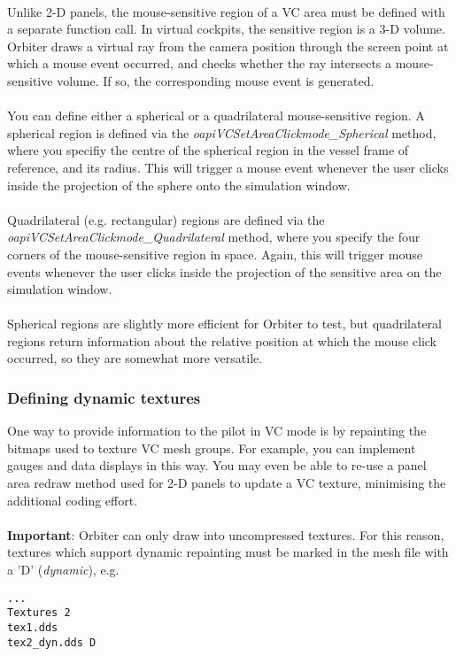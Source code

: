 \documentclass[Orbiter Developer Manual.tex]{subfiles}
\begin{document}
\\
Unlike 2-D panels, the mouse-sensitive region of a VC area must be defined with a separate function call. In virtual cockpits, the sensitive region is a 3-D volume. Orbiter draws a virtual ray from the camera position through the screen point at which a mouse event occurred, and checks whether the ray intersects a mouse-sensitive volume. If so, the corresponding mouse event is generated.\\
\\
You can define either a spherical or a quadrilateral mouse-sensitive region. A spherical region is defined via the \textit{oapiVCSetAreaClickmode\_Spherical} method, where you specifiy the centre of the spherical region in the vessel frame of reference, and its radius. This will trigger a mouse event whenever the user clicks inside the projection of the sphere onto the simulation window.\\
\\
Quadrilateral (e.g. rectangular) regions are defined via the \textit{oapiVCSetAreaClickmode\_Quadrilateral} method, where you specify the four corners of the mouse-sensitive region in space. Again, this will trigger mouse events whenever the user clicks inside the projection of the sensitive area on the simulation window.\\
\\
Spherical regions are slightly more efficient for Orbiter to test, but quadrilateral regions return information about the relative position at which the mouse click occurred, so they are somewhat more versatile.


\subsubsection{Defining dynamic textures}
One way to provide information to the pilot in VC mode is by repainting the bitmaps used to texture VC mesh groups. For example, you can implement gauges and data displays in this way. You may even be able to re-use a panel area redraw method used for 2-D panels to update a VC texture, minimising the additional coding effort.\\
\\
\textbf{Important}: Orbiter can only draw into uncompressed textures. For this reason, textures which support dynamic repainting must be marked in the mesh file with a 'D' (\textit{dynamic}), e.g.

\begin{lstlisting}
...
Textures 2
tex1.dds
tex2_dyn.dds D
\end{lstlisting}
\end{document}
